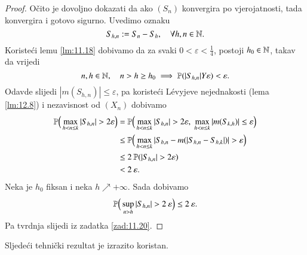 \begin{proof}
    O\v cito je dovoljno dokazati da ako $(S_n)$ konvergira po vjerojatnosti, tada konvergira i gotovo sigurno.
    Uvedimo oznaku
    \begin{equation*}
        S_{h, n} := S_n - S_h, \quad \forall h, n \in \mathbb{N}.
    \end{equation*}
    Koriste\' ci lemu \ref{lm:11.18} dobivamo da za svaki $0 < \varepsilon < \frac{1}{4}$, postoji $h_0 \in \mathbb{N}$, takav da vrijedi
    \begin{equation*}
        n, h \in \mathbb{N}, \quad n > h \geq h_0 \implies \mathbb{P}({|S_{h, n}| Y \varepsilon}) < \varepsilon.
    \end{equation*}
    Odavde slijedi $|m(S_{h, n})| \leq \varepsilon$, pa koriste\' ci L\' evyjeve nejednakosti (lema \ref{lm:12.8}) i nezavisnost od $(X_n)$ dobivamo
    \begin{equation*}
        \begin{aligned}
            \mathbb{P} \Big( \max\limits_{h < n \leq k} |S_{h, n}| > 2 \varepsilon \Big) &= \mathbb{P} \Big( \max\limits_{h < n \leq k} |S_{h, n}| > 2 \varepsilon, \; \max\limits_{h < n \leq k} |m(S_{k, h})| \leq \varepsilon \Big)\\
            &\leq \mathbb{P} \Big( \max\limits_{h < n \leq k} |S_{h, n} - m(|S_{h, n} - S_{h, k}|)| > \varepsilon \Big)\\
            &\leq 2 \: \mathbb{P}({|S_{h, n}| > 2 \varepsilon})\\
            &< 2 \: \varepsilon. 
        \end{aligned}
    \end{equation*}
    Neka je $h_0$ fiksan i neka $h \nearrow +\infty$.
    Sada dobivamo
    \begin{equation*}
        \mathbb{P} \Big( \sup\limits_{n > h} |S_{h, n}| > 2 \: \varepsilon \Big) \leq 2 \: \varepsilon.
    \end{equation*}
    Pa tvrdnja slijedi iz zadatka \ref{zad:11.20}.
\end{proof}

Sljede\' ci tehni\v cki rezultat je izrazito koristan.

